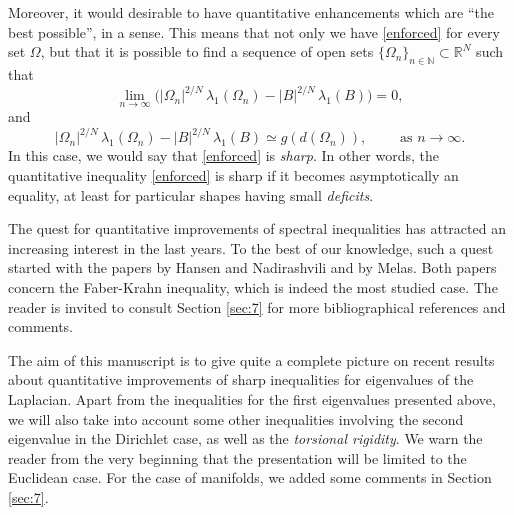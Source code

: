 \documentclass{amsart}
\theoremstyle{definition}
\numberwithin{equation}{section}
\begin{document}
Moreover, it would desirable to have quantitative enhancements which are ``the best possible'', in a sense. This means that not only we have \eqref{enforced} for every set $\Omega$,
but that it is possible to find a sequence of open sets $\{\Omega_n\}_{n\in\mathbb{N}}\subset\mathbb{R}^N$ such that
\[
\lim_{n\to\infty}\Big(|\Omega_n|^{2/N}\, \lambda_1(\Omega_n)-|B|^{2/N}\, \lambda_1(B)\Big)=0,
\]
and
\[
|\Omega_n|^{2/N}\, \lambda_1(\Omega_n)-|B|^{2/N}\, \lambda_1(B)\simeq g(d(\Omega_n)),\qquad \mbox{ as } n\to \infty.
\]
In this case, we would say that \eqref{enforced} is {\it sharp}.
In other words, the quantitative inequality \eqref{enforced} is sharp if it becomes asymptotically an equality, at least for particular shapes having small {\it deficits}.
\par
The quest for quantitative improvements of spectral inequalities has attracted an increasing interest in the last years. To the best of our knowledge, such a quest started with the papers \cite{MR1266215} by Hansen and Nadirashvili and \cite{MR1168980} by Melas. Both papers concern the Faber-Krahn inequality, which is indeed the most studied case. The reader is invited to consult Section \ref{sec:7} for more bibliographical references and comments.
\par
The aim of this manuscript is to give quite a complete picture on recent results about quantitative improvements of sharp inequalities for eigenvalues of the Laplacian. Apart from the inequalities for the first eigenvalues presented above, we will also take into account some other inequalities involving the second eigenvalue in the Dirichlet case, as well as the {\it torsional rigidity}. We warn the reader from the very beginning that the presentation will be limited to the Euclidean case. For the case of manifolds, we added some comments in Section \ref{sec:7}. 
\end{document}
